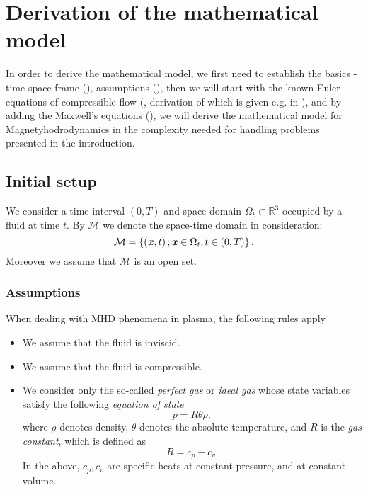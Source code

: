 \section{Derivation of the mathematical model}
In order to derive the mathematical model, we first need to establish the basics - time-space frame (), assumptions (), then we will start with the known Euler equations of compressible flow (, derivation of which is given e.g. in \cite{diplomka}), and by adding the Maxwell's equations (), we will derive the mathematical model for Magnetyhodrodynamics in the complexity needed  for handling problems presented in the introduction.
\subsection{Initial setup}
\label{subsec:init}

We consider a time interval $\left(0,T\right)$ and space domain $\Omega_{t}\subset \mathbb{R}^3$ occupied by a fluid at time $t$.
By $\mathcal{M}$ we denote the space-time domain in consideration: 
\begin{equation}\label{M}
\mathcal{M}=\left\{\left(\textbf{\textit{x}},t\right);\\\textbf{\textit{x}}\in\Omega_{t},t\in\left(0,T\right)\right \}.
\end{equation}
Moreover we assume that $\mathcal{M}$ is an open set.

\subsubsection{Assumptions}
\label{subsec:assump}
When dealing with MHD phenomena in plasma, the following rules apply
\begin{itemize}
    \item We assume that the fluid is inviscid.
    \item We assume that the fluid is compressible.
    \item We consider only the so-called \textit{perfect gas} or \textit{ideal gas} whose state variables satisfy the following \textit{equation of state}
    \begin{equation}\label{start_therm}
    p = R\theta\rho,
    \end{equation}
    where $\rho$ denotes density, $\theta$ denotes the absolute temperature, and $R$ is the \textit{gas constant}, which is defined as 
    \begin{equation}
    R = c_p - c_v.
    \end{equation}
    In the above, $c_p, c_v$ are specific heats at constant pressure, and at constant volume.
\end{itemize}

